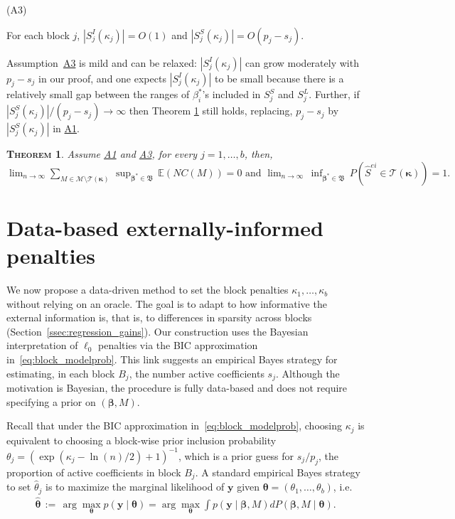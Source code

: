 \documentclass[
  12pt]{article}
\newcommand{\E}{\mathbb{E}}
\newcommand{\M}{\mathcal{M}}
\newcommand{\T}{\mathcal{T}}
\newcommand{\by}{\mathbf{y}}
\newcommand{\bbeta}{\boldsymbol{\beta}}
\newcommand{\btheta}{\boldsymbol{\theta}}
\newcommand{\bkappa}{\boldsymbol{\kappa}}
\newtheorem{thm}{\textsc{Theorem}}[section]
\begin{document}
\hypertarget{lab:A3}{(A3)} \quad For each block $j$, $|S_j^{I}(\kappa_j)|=O(1)$ and $|S_j^{S}(\kappa_j)|=O(p_j-s_j)$.

Assumption~\hyperlink{lab:A3}{A3} is mild and can be relaxed:  
$|S_j^{I}(\kappa_j)|$ can grow moderately with $p_j-s_j$ in our proof,
and one expects $|S_j^{I}(\kappa_j)|$ to be small because there is a relatively small gap between the ranges of $\beta_i^*$'s included in $S_j^S$ and $S_j^L$. 
Further, if $|S_j^{S}(\kappa_j)|/ (p_j-s_j) \to \infty$ then Theorem \ref{thm:convtoT} still holds, replacing, $p_j-s_j$ by $|S_j^{S}(\kappa_j)|$ in \hyperlink{lab:A1}{A1}.
\begin{thm}\label{thm:convtoT}
    Assume \hyperlink{lab:A1}{A1} and \hyperlink{lab:A3}{A3}, for every $j=1,\ldots,b$,  then, \\$\lim_{n \to \infty} \sum_{M \in \M\setminus \T(\bkappa)} \, \sup_{\bbeta^*\in\mathfrak{B}}\, \E\left(NC(M)\right)= 0 \mbox{  and  } 
    \lim_{n \to \infty} \, \inf_{\bbeta^*\in\mathfrak{B}}\, P(\hat{S}^{ei} \in \T(\bkappa))= 1.$
\end{thm}


\section{Data-based externally-informed penalties}\label{sec:informed_l0}

We now propose a data-driven method to set the block penalties $\kappa_1,\ldots,\kappa_b$ without relying on an oracle.
The goal is to adapt to how informative the external information is, that is, to differences in sparsity across blocks (Section~\ref{ssec:regression_gains}). Our construction uses the Bayesian interpretation of $\ell_0$ penalties via the BIC approximation in~\eqref{eq:block_modelprob}.
This link suggests an empirical Bayes strategy for estimating, in each block $B_j$, the number active coefficients $s_j$.
Although the motivation is Bayesian, the procedure is fully data-based and does not require specifying a prior on $(\bbeta,M)$.

Recall that under the BIC approximation in~\eqref{eq:block_modelprob}, choosing $\kappa_j$ is equivalent to choosing a block-wise prior inclusion probability %
$\theta_j=(\exp(\kappa_j-\ln(n)/2)+1)^{-1}$,
which is %
a prior guess for $s_j/p_j$, the proportion of active coefficients in block $B_j$. A standard empirical Bayes strategy to set $\hat{\theta}_j$ is to maximize the marginal likelihood of $\by$ given $\btheta=(\theta_1,\ldots,\theta_b)$, i.e.
\begin{eqnarray}
\hat{\btheta}
\,:=\, \arg\max_{\btheta} p(\by \mid \btheta)=
\arg\max_{\btheta} \int p(\by \mid \bbeta, M) d P(\bbeta, M \mid \btheta).
\nonumber
\end{eqnarray}
\end{document}
